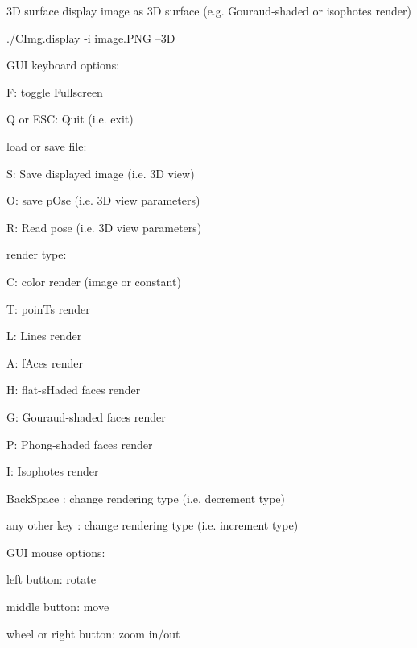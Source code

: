 \begin{DoxyParagraph}{3\-D surface}
display image as 3\-D surface (e.\-g. Gouraud-\/shaded or isophotes render) 
\begin{DoxyCode}
   ./CImg.display -i image.PNG --3D
\end{DoxyCode}
 G\-U\-I keyboard options\-: \begin{DoxyItemize}
\item {\ttfamily F\-:} toggle Fullscreen \item {\ttfamily Q} or E\-S\-C\-: Quit (i.\-e. exit)\end{DoxyItemize}
load or save file\-: \begin{DoxyItemize}
\item {\ttfamily S\-:} Save displayed image (i.\-e. 3\-D view) \item {\ttfamily O\-:} save p\-Ose (i.\-e. 3\-D view parameters) \item {\ttfamily R\-:} Read pose (i.\-e. 3\-D view parameters)\end{DoxyItemize}
render type\-: \begin{DoxyItemize}
\item {\ttfamily C\-:} color render (image or constant) \item {\ttfamily T\-:} poin\-Ts render \item {\ttfamily L\-:} Lines render \item {\ttfamily A\-:} f\-Aces render \item {\ttfamily H\-:} flat-\/s\-Haded faces render \item {\ttfamily G\-:} Gouraud-\/shaded faces render \item {\ttfamily P\-:} Phong-\/shaded faces render \item {\ttfamily I\-:} Isophotes render \item {\ttfamily Back\-Space} \-: change rendering type (i.\-e. decrement type) \item any other key \-: change rendering type (i.\-e. increment type)\end{DoxyItemize}
G\-U\-I mouse options\-: \begin{DoxyItemize}
\item {\ttfamily left} button\-: rotate \item {\ttfamily middle} button\-: move \item {\ttfamily wheel} or {\ttfamily right} button\-: zoom in/out  \end{DoxyItemize}

\end{DoxyParagraph}
